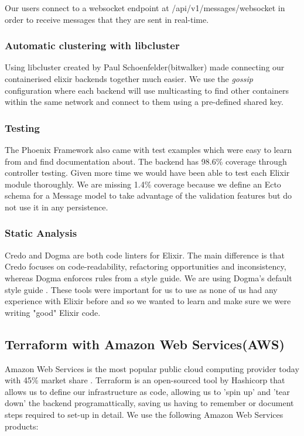 \documentclass[11pt,a4paper]{report}
\begin{document}
Our users connect to a websocket endpoint at /api/v1/messages/websocket in order to receive messages that they are sent in real-time.

\subsubsection{Automatic clustering with libcluster}

Using libcluster created by Paul Schoenfelder(bitwalker) made connecting our containerised elixir backends together much easier. We use the \textit{gossip} configuration where each backend will use multicasting to find other containers within the same network and connect to them using a pre-defined shared key.

\subsubsection{Testing}

The Phoenix Framework also came with test examples which were easy to learn from and find documentation about. The backend has 98.6\% coverage through controller testing. Given more time we would have been able to test each Elixir module thoroughly. We are missing 1.4\% coverage because we define an Ecto schema for a Message model to take advantage of the validation features but do not use it in any persistence.

\subsubsection{Static Analysis}

Credo and Dogma are both code linters for Elixir. The main difference is that Credo focuses on code-readability, refactoring opportunities and inconsistency, whereas Dogma enforces rules from a style guide. We are using Dogma's default style guide \cite{website:elixir_dogma_rules}. These tools were important for us to use as none of us had any experience with Elixir before and so we wanted to learn and make sure we were writing "good" Elixir code.

\subsection{Terraform with Amazon Web Services(AWS)}

Amazon Web Services is the most popular public cloud computing provider today with 45\% market share \cite{website:geekwire_cloud_share}. Terraform is an open-sourced tool by Hashicorp that allows us to define our infrastructure as code, allowing us to 'spin up' and 'tear down' the backend programattically, saving us having to remember or document steps required to set-up in detail. We use the following Amazon Web Services products:
\end{document}
